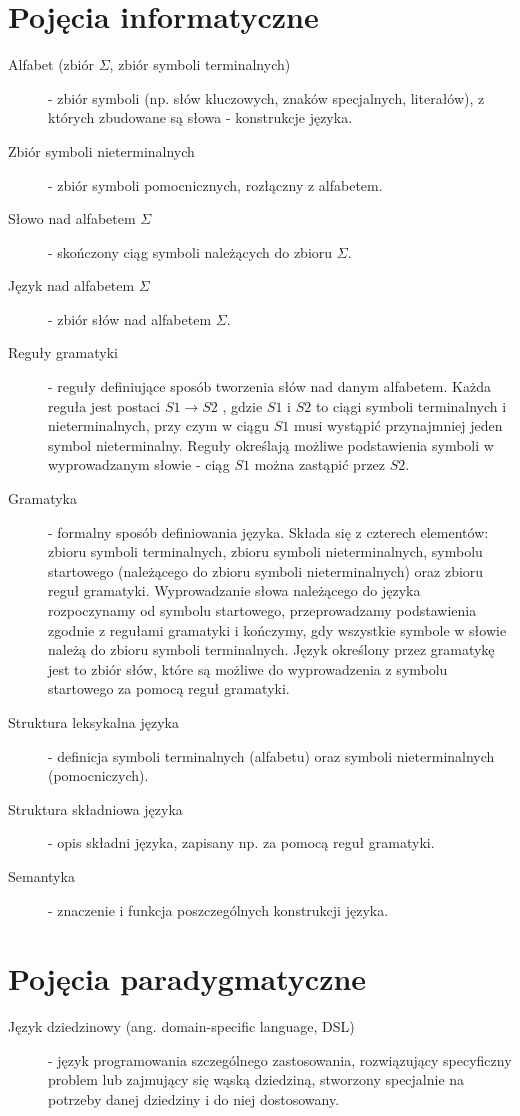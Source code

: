 \section{Pojęcia informatyczne}
\begin{description}
 \item[Alfabet (zbiór $\Sigma$, zbiór symboli terminalnych)] - zbiór symboli (np. słów kluczowych, znaków specjalnych, literałów), z których zbudowane są słowa - konstrukcje języka.
 \item[Zbiór symboli nieterminalnych] - zbiór symboli pomocnicznych, rozłączny z alfabetem.
 \item[Słowo nad alfabetem $\Sigma$] - skończony ciąg symboli należących do zbioru $\Sigma $.
 \item[Język nad alfabetem $\Sigma$] - zbiór słów nad alfabetem $\Sigma $.
 \item[Reguły gramatyki] - reguły definiujące sposób tworzenia słów nad danym alfabetem. Każda reguła jest postaci $S1 \rightarrow S2$ , gdzie $S1$ i $S2$ to ciągi symboli terminalnych i nieterminalnych, przy czym w ciągu $S1$ musi wystąpić przynajmniej jeden symbol nieterminalny. Reguły określają możliwe podstawienia symboli w wyprowadzanym słowie - ciąg $S1$ można zastąpić przez $S2$. 
 \item[Gramatyka] - formalny sposób definiowania języka. Składa się z czterech elementów: zbioru symboli terminalnych, zbioru symboli nieterminalnych, symbolu startowego (należącego do zbioru symboli nieterminalnych) oraz zbioru reguł gramatyki. Wyprowadzanie słowa należącego do języka rozpoczynamy od symbolu startowego, przeprowadzamy podstawienia zgodnie z regułami gramatyki i kończymy, gdy wszystkie symbole w słowie należą do zbioru symboli terminalnych. Język określony przez gramatykę jest to zbiór słów, które są możliwe do wyprowadzenia z symbolu startowego za pomocą reguł gramatyki.
 \item[Struktura leksykalna języka] - definicja symboli terminalnych (alfabetu) oraz symboli nieterminalnych (pomocniczych).
 \item[Struktura składniowa języka] - opis składni języka, zapisany np. za pomocą reguł gramatyki.
 \item[Semantyka] - znaczenie i funkcja poszczególnych konstrukcji języka.
 \end{description}
\section{Pojęcia paradygmatyczne}
\begin{description}
 \item[Język dziedzinowy (ang. domain-specific language, DSL)] - język programowania szczególnego zastosowania, rozwiązujący specyficzny problem lub zajmujący się wąską dziedziną, stworzony specjalnie na potrzeby danej dziedziny i do niej dostosowany.
 
 \end{description}